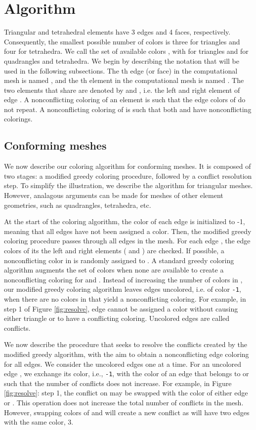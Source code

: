 \documentclass[12pt]{article}
\begin{document}
\section{Algorithm} \label{sec:algorithm}
Triangular and tetrahedral elements have 3 edges and 4 faces, respectively.  Consequently, the smallest possible number of colors is three for triangles and four for tetrahedra.  We call the set of available colors , with  for triangles and  for quadrangles and tetrahedra.  We begin by describing the notation that will be used in the following subsections.  The th edge (or face) in the computational mesh is named , and the th element in the computational mesh is named .  The two elements that share  are denoted by  and , i.e. the left and right element of edge .  A nonconflicting coloring of an element  is such that the edge colors of  do not repeat. A nonconflicting coloring of  is such that both  and  have nonconflicting colorings.


\subsection{Conforming meshes}

We now describe our coloring algorithm for conforming meshes.  It is composed of two stages: a modified greedy coloring procedure, followed by a conflict resolution step.  To simplify the illustration, we describe the algorithm for triangular meshes.  However, analagous arguments can be made for meshes of other element geometries, such as quadrangles, tetrahedra, etc.

At the start of the coloring algorithm, the color of each edge is initialized to -1, meaning that all edges have not been assigned a color.  Then, the modified greedy coloring procedure passes through all edges  in the mesh.  For each edge , the edge colors of its the left and right elements ( and ) are checked.  
If possible, a nonconflicting color in  is randomly assigned to . A standard greedy coloring algorithm augments the set of colors when none are available to create a nonconflicting coloring for  and .  
Instead of increasing the number of colors in , our modified greedy coloring algorithm leaves edges uncolored, i.e. of color \texttt{-1}, when there are no colors in  that yield a nonconflicting coloring.  
For example, in step 1 of Figure \ref{fig:resolve}, edge  cannot be assigned a color without causing either triangle  or  to have a conflicting coloring.  
Uncolored edges are called conflicts. 

We now describe the procedure that seeks to resolve the conflicts created by the modified greedy algorithm, with the aim to obtain a nonconflicting edge coloring for all edges.  
We consider the uncolored edges one at a time.  
For an uncolored edge , we exchange its color, i.e., \texttt{-1}, with the color of an edge that belongs to  or  such that the number of conflicts does not increase.  For example, in Figure \ref{fig:resolve}: step 1, the conflict on  may be swapped with the color of either edge  or .  
This operation does not increase the total number of conflicts in the mesh.  However, swapping colors of  and  will create a new conflict as  will have two edges with the same color, 3.  
 
\end{document}
